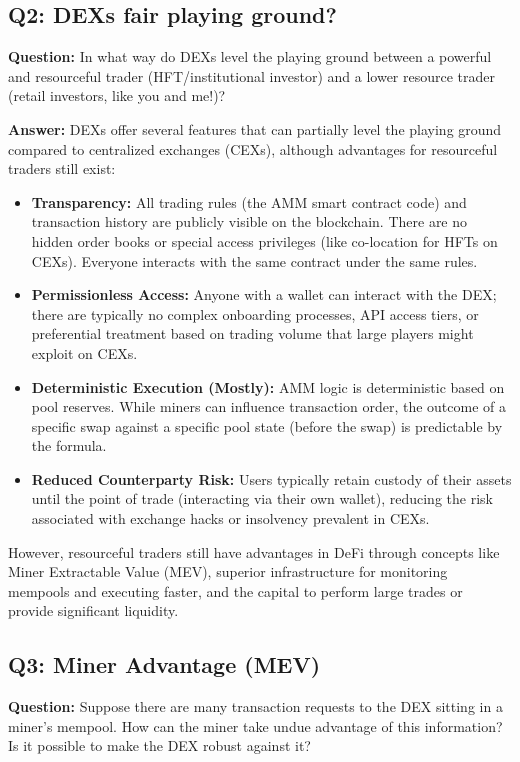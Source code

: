 \documentclass[12pt]{article}
\begin{document}
\subsection{Q2: DEXs fair playing ground?}
\textbf{Question:} In what way do DEXs level the playing ground between a powerful and resourceful trader (HFT/institutional investor) and a lower resource trader (retail investors, like you and me!)?

\textbf{Answer:} DEXs offer several features that can partially level the playing ground compared to centralized exchanges (CEXs), although advantages for resourceful traders still exist:
\begin{itemize}
    \item \textbf{Transparency:} All trading rules (the AMM smart contract code) and transaction history are publicly visible on the blockchain. There are no hidden order books or special access privileges (like co-location for HFTs on CEXs). Everyone interacts with the same contract under the same rules.
    \item \textbf{Permissionless Access:} Anyone with a wallet can interact with the DEX; there are typically no complex onboarding processes, API access tiers, or preferential treatment based on trading volume that large players might exploit on CEXs.
    \item \textbf{Deterministic Execution (Mostly):} AMM logic is deterministic based on pool reserves. While miners can influence transaction order, the outcome of a specific swap against a specific pool state (before the swap) is predictable by the formula.
    \item \textbf{Reduced Counterparty Risk:} Users typically retain custody of their assets until the point of trade (interacting via their own wallet), reducing the risk associated with exchange hacks or insolvency prevalent in CEXs.
\end{itemize}
However, resourceful traders still have advantages in DeFi through concepts like Miner Extractable Value (MEV), superior infrastructure for monitoring mempools and executing faster, and the capital to perform large trades or provide significant liquidity.

\subsection{Q3: Miner Advantage (MEV)}
\textbf{Question:} Suppose there are many transaction requests to the DEX sitting in a miner's mempool. How can the miner take undue advantage of this information? Is it possible to make the DEX robust against it?
\end{document}
